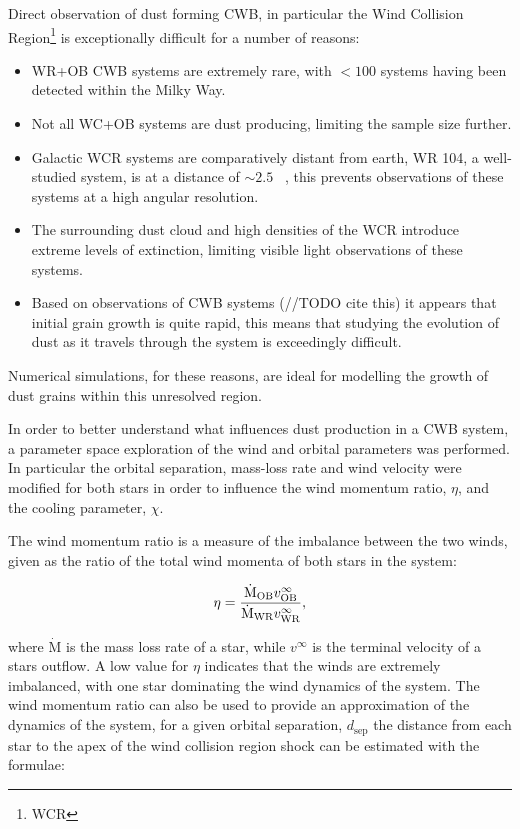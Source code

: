 
Direct observation of dust forming CWB, in particular the Wind Collision Region\footnote{WCR} is exceptionally difficult for a number of reasons:

\begin{itemize}
  \item WR+OB CWB systems are extremely rare, with $< 100$ systems having been detected within the Milky Way.
  \item Not all WC+OB systems are dust producing, limiting the sample size further.
  \item Galactic WCR systems are comparatively distant from earth, WR 104, a well-studied system, is at a distance of $\sim 2.5$ \si{\kilo\parsec}, this prevents observations of these systems at a high angular resolution.
  \item The surrounding dust cloud and high densities of the WCR introduce extreme levels of extinction, limiting visible light observations of these systems.
  \item Based on observations of CWB systems (//TODO cite this) it appears that initial grain growth is quite rapid, this means that studying the evolution of dust as it travels through the system is exceedingly difficult.
\end{itemize}

Numerical simulations, for these reasons, are ideal for modelling the growth of dust grains within this unresolved region.


In order to better understand what influences dust production in a CWB system, a parameter space exploration of the wind and orbital parameters was performed.
In particular the orbital separation, mass-loss rate and wind velocity were modified for both stars in order to influence the wind momentum ratio, $\eta$, and the cooling parameter, $\chi$.


The wind momentum ratio is a measure of the imbalance between the two winds, given as the ratio of the total wind momenta of both stars in the system:

\begin{equation}
  \eta = \frac{\dot{\text M}_\text{OB} v^\infty_\text{OB}}{\dot{\text M}_\text{WR}v^\infty_\text{WR}} ,
\end{equation}

where $\dot{\text{M}}$ is the mass loss rate of a star, while $v^\infty$ is the terminal velocity of a stars outflow.
A low value for $\eta$ indicates that the winds are extremely imbalanced, with one star dominating the wind dynamics of the system.
The wind momentum ratio can also be used to provide an approximation of the dynamics of the system, for a given orbital separation, $d_\text{sep}$ the distance from each star to the apex of the wind collision region shock can be estimated with the formulae:

